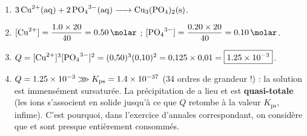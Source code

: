 \documentclass[11pt,a4paper]{article}
\newcommand{\Kps}{K_{\mathrm{ps}}}
\begin{document}
\begin{correction}
\begin{enumerate}[label=\textbf{\alph*)},leftmargin=2.2em,topsep=2pt,itemsep=2pt]
  \item $\ce{3 Cu^{2+}(aq) + 2 PO4^{3-}(aq) -> Cu3(PO4)2(s)}$.
  \item $[\ce{Cu^2+}]=\dfrac{\num{1{,}0}\times 20}{40}=\qty{0{,}50}{\molar}$ ;
        $[\ce{PO4^3-}]=\dfrac{\num{0{,}20}\times 20}{40}=\qty{0{,}10}{\molar}$.
  \item $Q=[\ce{Cu^2+}]^{3}[\ce{PO4^3-}]^{2}=(0{,}50)^{3}(0{,}10)^{2}=0{,}125\times 0{,}01
        =\boxed{\num{1{,}25e-3}}$.
  \item $Q=\num{1{,}25e-3}\ggg\Kps=\num{1{,}4e-37}$ (34 ordres de grandeur !) : la solution est
        immensément sursaturée. La précipitation de  a lieu et est \textbf{quasi-totale}
        (les ions s'associent en solide jusqu'à ce que $Q$ retombe à la valeur $\Kps$, infime). C'est
        pourquoi, dans l'exercice d'annales correspondant, on considère que  et 
        sont presque entièrement consommés.
\end{enumerate}
\end{correction}
\end{document}
